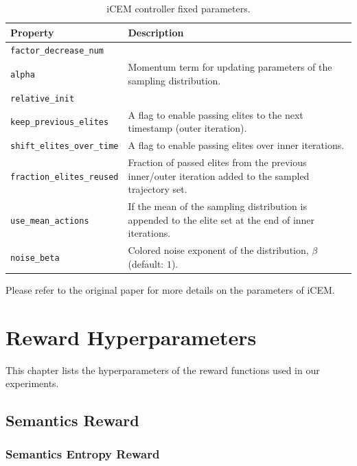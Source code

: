 \begin{table}[H]
    \centering
    \begin{tabularx}{\textwidth}{C{4.7cm} L}
        \hline
        Property & Description\\
        \hline
        \texttt{factor\_decrease\_num} & \\
        \texttt{alpha} & Momentum term for updating parameters of the sampling distribution.\\
        \texttt{relative\_init} & \\
        \texttt{keep\_previous\_elites} & A flag to enable passing elites to the next timestamp (outer iteration).\\
        \texttt{shift\_elites\_over\_time} & A flag to enable passing elites over inner iterations.\\
        \texttt{fraction\_elites\_reused} & Fraction of passed elites from the previous inner/outer iteration added to the sampled trajectory set.\\
        \texttt{use\_mean\_actions} & If the mean of the sampling distribution is appended to the elite set at the end of inner iterations.\\
        \texttt{noise\_beta} & Colored noise exponent of the distribution, \(\beta\) (default: \(1\)).\\
        \hline
    \end{tabularx}
    \caption{iCEM controller fixed parameters.}
    \label{tab:icem-params-fixed}
\end{table}

Please refer to the original paper for more details on the parameters of iCEM.


\chapter{Reward Hyperparameters}
\label{sec:reward-details}

This chapter lists the hyperparameters of the reward functions used in our experiments.

\section{Semantics Reward}
\label{sec:semantics-reward-details}

\subsection{Semantics Entropy Reward}
\label{sec:semantics-entropy-reward-details}


